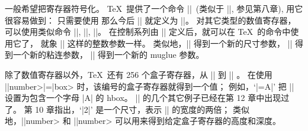 \danger 一般希望把寄存器符号化。%
 \TeX\ 提供了一个命令 |\countdef|~(类似于 |\chardef|, 参见第八章),
用它很容易做到：
只需要使用
\begintt
\countdef{}
\endtt
那么今后 |\chapno| 就定义为 ||。%
对其它类型的数值寄存器，可以使用类似命令 |\dimendef|, |\skipdef|, |\muskipdef|。%
在控制系列由 |\countdef| 定义后，就可以在 \TeX\ 的命令中使用它了，
就象 |\tolerance| 这样的整数参数一样。%
类似地，|\dimendef| 得到一个新的尺寸参数，
|\skipdef| 得到一个新的粘连参数，
|\muskipdef| 得到一个新的 muglue 参数。

\danger \1除了数值寄存器以外，\TeX\ 还有 256 个盒子寄存器，从 || 到 || 。
在使用 |\setbox|\<number>|=|\<box> 时，该编号的盒子寄存器就得到一个值；
例如，`|=\hbox{A}|' 把 || 设置为包含一个字母 |A| 的 hbox。
|\setbox| 的几个其它例子已经在第 12 章中出现过了。
第 10 章指出，`|2|' 是一个尺寸，表示 || 的宽度的两倍；
类似地，|\ht|\<number> 和 |\dp|\<number> 可以用来得到给定盒子寄存器的高度和深度。

